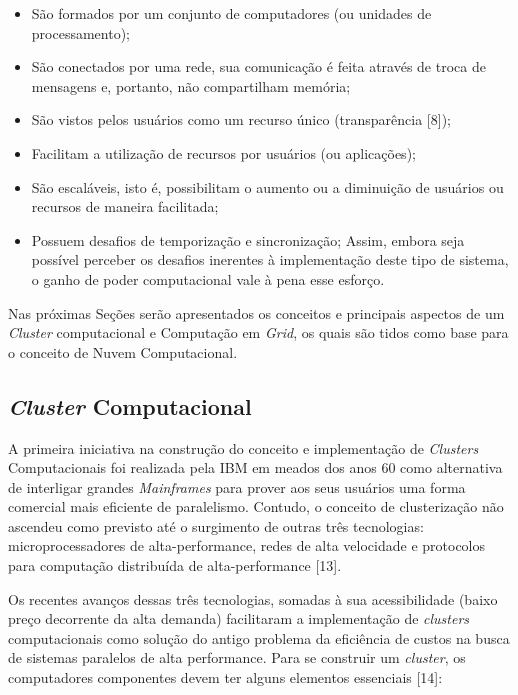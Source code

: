\begin{itemize}
    \item São formados por um conjunto de computadores (ou unidades de processamento);
    \item São conectados por uma rede, sua comunicação é feita através de troca de mensagens e, portanto, não compartilham memória;
    \item São vistos pelos usuários como um recurso único (transparência [8]);
    \item Facilitam a utilização de recursos por usuários (ou aplicações);
    \item São escaláveis, isto é, possibilitam o aumento ou a diminuição de usuários ou recursos de maneira facilitada;
    \item Possuem desafios de temporização e sincronização;
    Assim, embora seja possível perceber os desafios inerentes à implementação deste tipo de sistema, o ganho de poder computacional vale à pena esse esforço.
\end{itemize}

Nas próximas Seções serão apresentados os conceitos e principais aspectos de um \textit{Cluster} computacional e Computação em \textit{Grid}, os quais são tidos como base para o conceito de Nuvem Computacional.

\subsection{\textit{Cluster} Computacional} \label{cap2sec1subsec1}

A primeira iniciativa na construção do conceito e implementação de \textit{Clusters} Computacionais foi realizada pela IBM em meados dos anos 60 como alternativa de interligar grandes \textit{Mainframes} para prover aos seus usuários uma forma comercial mais eficiente de paralelismo. Contudo, o conceito de clusterização não ascendeu como previsto até o surgimento de outras três tecnologias: microprocessadores de alta-performance, redes de alta velocidade e protocolos para computação distribuída de alta-performance [13]. 

Os recentes avanços dessas três tecnologias, somadas à sua acessibilidade (baixo preço decorrente da alta demanda) facilitaram a implementação de \textit{clusters} computacionais como solução do antigo problema da eficiência de custos na busca de sistemas paralelos de alta performance. Para se construir um \textit{cluster}, os computadores componentes devem ter alguns elementos essenciais [14]:

